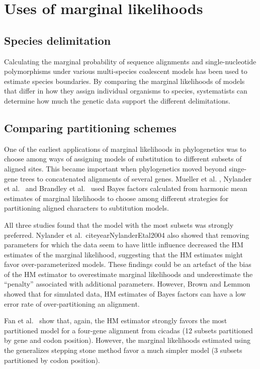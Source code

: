 \section{Uses of marginal likelihoods}

\subsection{Species delimitation}
Calculating the marginal probability of sequence alignments \citep{Grummer2013}
and single-nucleotide polymorphisms \citep{Leache2014}
under various multi-species coalescent models has been used
to estimate species boundaries.
By comparing the marginal likelihoods of models that differ in
how they assign individual organisms to species, systematists
can determine how much the genetic data support the different
delimitations.

\subsection{Comparing partitioning schemes}

One of the earliest applications of marginal likelihoods in phylogenetics was
to choose among ways of assigning models of substitution to different subsets
of aligned sites.
This became important when phylogenetics moved beyond singe-gene trees to
concatenated alignments of several genes.
Mueller et al. \citeyear{Mueller2004},
Nylander et al.\ \citeyear{NylanderEtal2004} and
Brandley et al.\ \citeyear{Brandley2005}
used Bayes factors calculated from harmonic mean
estimates of marginal likelihoods to choose among different strategies for
partitioning aligned characters to subtitution models.

All three studies found that the model with the most subsets was strongly
preferred.
Nylander et al.\ citeyear{NylanderEtal2004} also showed that removing
parameters for which the data seem to have little influence decreased
the HM estimates of the marginal likelihood, suggesting that the HM
estimates might favor over-parameterized models.
These findings could be an artefact of the bias of the HM estimator to
overestimate marginal likelihoods and underestimate the ``penalty'' associated
with additional parameters.
However, Brown and Lemmon \citeyear{Brown2007} showed that for simulated data,
HM estimates of Bayes factors can have a low error rate of over-partitioning an
alignment.

Fan et al.\ \citeyear{Fan2011} show that, again, the HM estimator strongly
favors the most partitioned model for a four-gene alignment from cicadas (12
subsets partitioned by gene and codon position).  However, the marginal
likelihoods estimated using the generalizes stepping stone method favor a much
simpler model (3 subsets partitioned by codon position).

